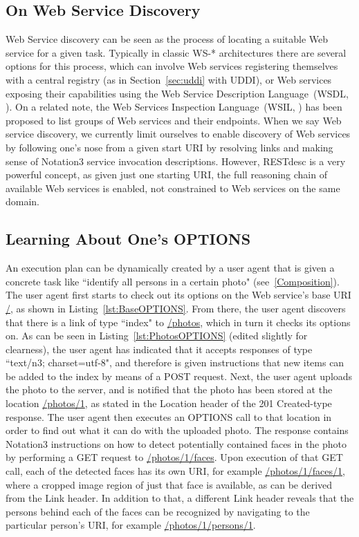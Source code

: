 \documentclass[smallextended]{svjour3}
\begin{document}
{\subsection{On Web Service Discovery}
Web Service discovery can be seen as the process of locating a suitable Web service for a given task. Typically in classic WS-* architectures there are several options for this process, which can involve Web services registering themselves with a central registry (as in Section~\ref{sec:uddi} with UDDI), or Web services exposing their capabilities using the Web Service Description Language~(WSDL, \cite{WSDL1,WSDL2}). On a related note, the Web Services Inspection Language~(WSIL, \cite{WSIL}) has been proposed to list groups of Web services and their endpoints. When we say Web service discovery, we currently limit ourselves to enable discovery of Web services by following one's nose from a given start URI by resolving links and making sense of Notation3 service invocation descriptions. However, RESTdesc is a very powerful concept, as given just one starting URI, the full reasoning chain of available Web services is enabled, not constrained to Web services on the same domain.

\subsection{Learning About One's OPTIONS} \label{MainStory}
An execution plan can be dynamically created by a user agent that is given a concrete task like ``identify all persons in a certain photo" (see~\autoref{Composition}). The user agent first starts to check out its options on the Web service's base URI \url{/}, as shown in Listing~\ref{lst:BaseOPTIONS}. From there, the user agent discovers that there is a link of type ``index" to \url{/photos}, which in turn it checks its options on. As can be seen in Listing~\ref{lst:PhotosOPTIONS} (edited slightly for clearness), the user agent has indicated that it accepts responses of type ``text/n3; charset=utf-8", and therefore is given instructions that new items can be added to the index by means of a POST request. Next, the user agent uploads the photo to the server, and is notified that the photo has been stored at the location \url{/photos/1}, as stated in the Location header of the 201 Created-type response. The user agent then executes an OPTIONS call to that location in order to find out what it can do with the uploaded photo. The response contains Notation3 instructions on how to detect potentially contained faces in the photo by performing a GET request to \url{/photos/1/faces}.  Upon execution of that GET call, each of the detected faces has its own URI, for example \url{/photos/1/faces/1}, where a cropped image region of just that face is available, as can be derived from the Link header. In addition to that, a different Link header reveals that the persons behind each of the faces can be recognized by navigating to the particular person's URI, for example \url{/photos/1/persons/1}.

}
\end{document}
